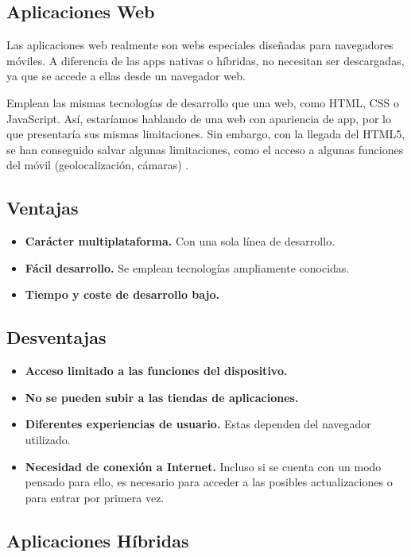 \subsection{Aplicaciones Web}

Las aplicaciones web realmente son webs especiales diseñadas para navegadores móviles. A diferencia de las apps nativas o híbridas, no necesitan ser descargadas, ya que se accede a ellas desde un navegador web.

Emplean las mismas tecnologías de desarrollo que una web, como HTML, CSS o JavaScript. Así, estaríamos hablando de una web con apariencia de app, por lo que presentaría sus mismas limitaciones. Sin embargo, con la llegada del HTML5, se han conseguido salvar algunas limitaciones, como el acceso a algunas funciones del móvil (geolocalización, cámaras) \cite{IM1}.

\subsection*{Ventajas}
\begin{itemize}
	\item \textbf{Carácter multiplataforma.} Con una sola línea de desarrollo.
	\item \textbf{Fácil desarrollo.} Se emplean tecnologías ampliamente conocidas.
	\item \textbf{Tiempo y coste de desarrollo bajo.}
\end{itemize}

\subsection*{Desventajas}
\begin{itemize}
	\item \textbf{Acceso limitado a las funciones del dispositivo.}
	\item \textbf{No se pueden subir a las tiendas de aplicaciones.}
	\item \textbf{Diferentes experiencias de usuario.} Estas dependen del navegador utilizado.
	\item \textbf{Necesidad de conexión a Internet.} Incluso si se cuenta con un modo pensado para ello, es necesario para acceder a las posibles actualizaciones o para entrar por primera vez.
\end{itemize}

\subsection{Aplicaciones Híbridas}

